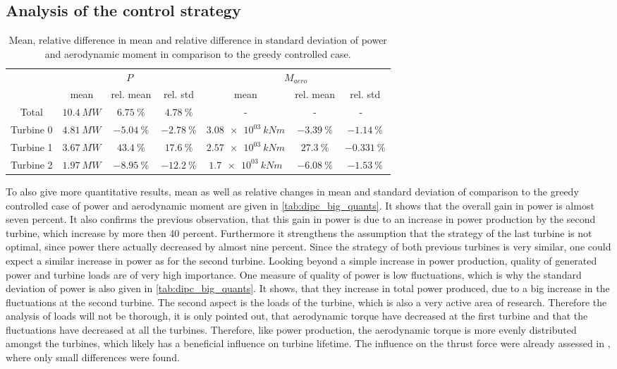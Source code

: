 \subsection{Analysis of the control strategy}
\begin{table}[h]
	\centering
	\caption{Mean, relative difference in mean and relative difference in standard deviation of power and aerodynamic moment in comparison to the greedy controlled case.}
	\begin{tabular}{ccccccc}
	\toprule
	& \multicolumn{3}{c}{$P$}  & \multicolumn{3}{c}{$M_{aero}$ }\\ \cmidrule(rl){2-4} \cmidrule(rl){5-7}
	& mean & rel. mean & rel. std  & mean & rel. mean & rel. std \\ \midrule
	Total & $\SI{  10.4}{MW} $ & $\SI{ +6.75}{\%}$ & $\SI{ +4.78}{\%}$ &-&-&- \
	\\
	Turbine 0  & $\SI{  4.81}{MW} $ & $\SI{ -5.04}{\%}$ & $\SI{ -2.78}{\%}$ & $\SI{3.08e+03}{kNm} $ & $\SI{ -3.39}{\%}$ & $\SI{ -1.14}{\%}$ \\
	Turbine 1  & $\SI{  3.67}{MW} $ & $\SI{ +43.4}{\%}$ & $\SI{ +17.6}{\%}$ & $\SI{2.57e+03}{kNm} $ & $\SI{ +27.3}{\%}$ & $\SI{-0.331}{\%}$ \\
	Turbine 2  & $\SI{  1.97}{MW} $ & $\SI{ -8.95}{\%}$ & $\SI{ -12.2}{\%}$ & $\SI{1.7e+03}{kNm} $ & $\SI{ -6.08}{\%}$ & $\SI{ -1.53}{\%}$ \\
	\bottomrule
	\end{tabular}
	\label{tab:dipc_big_quants}
\end{table}
To also give more quantitative results, mean as well as relative changes in mean and standard deviation of comparison to the greedy controlled case of power and aerodynamic moment are given in \autoref{tab:dipc_big_quants}. It shows that the overall gain in power is almost seven percent. It also confirms the previous observation, that this gain in power is due to an increase in power production by the second turbine, which increase by more then 40 percent. Furthermore it strengthens the assumption that the strategy of the last turbine is not optimal, since power there actually decreased by almost nine percent. Since the strategy of both previous turbines is very similar, one could expect a similar increase in power as for the second turbine. Looking beyond a simple increase in power production, quality of generated power and turbine loads are of very high importance. One measure of quality of power is low fluctuations, which is why the standard deviation of power is also given in \autoref{tab:dipc_big_quants}. It shows, that they increase in total power produced, due to a big increase in the fluctuations at the second turbine. The second aspect is the loads of the turbine, which is also a very active area of research. Therefore the analysis of loads will not be thorough, it is only pointed out, that aerodynamic torque have decreased at the first turbine and that the fluctuations have decreased at all the turbines. Therefore, like power production, the aerodynamic torque is more evenly distributed amongst the turbines, which likely has a beneficial influence on turbine lifetime. The influence on the thrust force were already assessed in \cite{frederik_helix_2020}, where only small differences were found.
